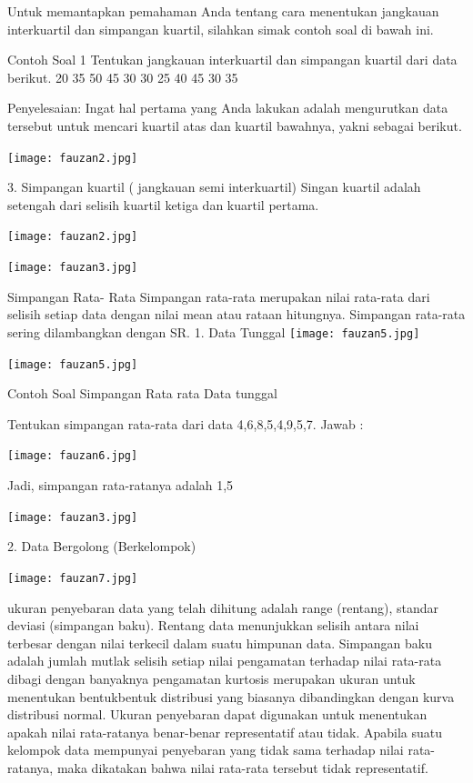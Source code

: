 \documentclass[11pt,fleqn]{book} %
\begin{document}
{Untuk memantapkan pemahaman Anda tentang cara menentukan jangkauan interkuartil dan simpangan kuartil, silahkan simak contoh soal di bawah ini.

Contoh Soal 1
Tentukan jangkauan interkuartil dan simpangan kuartil dari data berikut.
20     35     50     45     30     30     25     40     45     30     35

Penyelesaian:
Ingat hal pertama yang Anda lakukan adalah mengurutkan data tersebut untuk mencari kuartil atas dan kuartil bawahnya, yakni sebagai berikut.

\texttt{[image: fauzan2.jpg]}

3. Simpangan kuartil ( jangkauan semi interkuartil)
Singan kuartil adalah setengah dari selisih kuartil ketiga dan kuartil pertama.

\texttt{[image: fauzan2.jpg]}

\texttt{[image: fauzan3.jpg]}

Simpangan Rata- Rata
Simpangan rata-rata merupakan nilai rata-rata dari selisih setiap data dengan nilai mean atau rataan hitungnya. Simpangan rata-rata sering dilambangkan dengan SR.
1. Data Tunggal
\texttt{[image: fauzan5.jpg]}

\texttt{[image: fauzan5.jpg]}

Contoh Soal Simpangan Rata rata Data tunggal

Tentukan simpangan rata-rata dari data 4,6,8,5,4,9,5,7.
Jawab :

\texttt{[image: fauzan6.jpg]}

Jadi, simpangan rata-ratanya adalah 1,5

\texttt{[image: fauzan3.jpg]}

2. Data Bergolong (Berkelompok)

\texttt{[image: fauzan7.jpg]}

ukuran penyebaran data yang telah dihitung adalah range (rentang), standar deviasi (simpangan  baku). Rentang data menunjukkan selisih antara nilai terbesar dengan nilai terkecil dalam suatu himpunan data. Simpangan baku adalah jumlah mutlak selisih setiap nilai pengamatan terhadap nilai rata-rata dibagi dengan banyaknya pengamatan kurtosis merupakan ukuran untuk menentukan bentukbentuk distribusi yang biasanya dibandingkan dengan kurva distribusi normal. Ukuran penyebaran dapat digunakan untuk menentukan apakah nilai rata-ratanya benar-benar representatif atau tidak. Apabila suatu kelompok data mempunyai penyebaran yang tidak sama terhadap nilai rata-ratanya, maka dikatakan bahwa nilai rata-rata tersebut tidak representatif.


}
\end{document}
